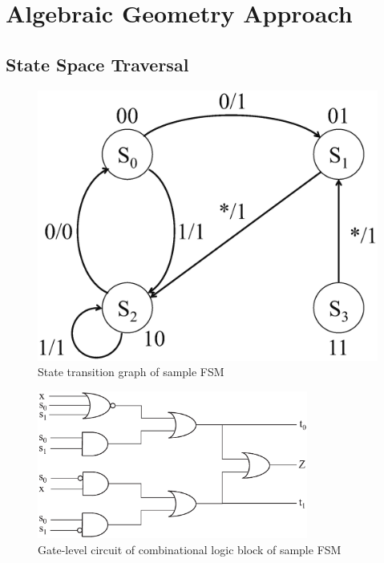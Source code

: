 \section{Algebraic Geometry Approach}
\subsection{State Space Traversal}

\begin{figure}[hbt]
\begin{center}
\includegraphics[scale=0.3]{./stg_fig.eps}
\caption{State transition graph of sample FSM}
\end{center}
\label{fig:stg}
\end{figure}

\begin{figure}[hbt]
\begin{center}
\includegraphics[width=3.5in]{./fsm_fig.eps}
\caption{Gate-level circuit of combinational logic block of sample FSM}
\end{center}
\label{fig:fsm}
\end{figure}


